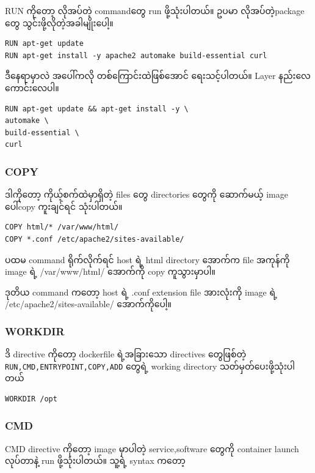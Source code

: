 \documentclass{article}
\begin{document}
RUN ကို​တော့ လိုအပ်​တဲ့ command​တွေ run ဖို့သုံးပါတယ်။ ဥပမာ
လိုအပ်တဲ့​package​တွေ သွင်းဖို့လိုတဲ့အခါမျိုး​ပေါ့။

\begin{verbatim}
RUN apt-get update 
RUN apt-get install -y apache2 automake build-essential curl ​​
\end{verbatim}

ဒီ​နေရာမှာလဲ အ​ပေါ်ကလို တစ်​​ကြောင်းထဲဖြစ်​​အောင်​ ​ရေးသင့်ပါတယ်​။ Layer
နည်း​လေ​ကောင်း​လေပါ။

\begin{verbatim}
RUN apt-get update && apt-get install -y \
automake \
build-essential \
curl
\end{verbatim}

\subsubsection{COPY}\label{copy}

ဒါကို​တော့ ကိုယ့်စက်​ထဲမှာရှိတဲ့ files ​တွေ directories ​တွေကို
​ဆောက်​မယ့် image ​ပေါ်copy ကူးချင်​ရင်​ သုံးပါတယ်။​

\begin{verbatim}
COPY html/* /var/www/html/
COPY *.conf /etc/apache2/sites-available/
\end{verbatim}

ပထမ command ရိုက်​လိုက်​ရင်​ host ရဲ့ html directory ​အောက်​က file
အကုန်​ကို image ရဲ့ /var/www/html/ ​အောက်​ကို copy ကူသွားမှာပါ။

ဒုတိယ command က​တော့ host ရဲ့ .conf extension file အားလုံးကို image ရဲ့
/etc/apache2/sites-available/ ​အောက်​ကို​ပေါ့။

\subsubsection{WORKDIR}\label{workdir}

ဒိ directive ကို​တော့ dockerfile ရဲ့အခြား​သော directives ​တွေဖြစ်​တဲ့
\texttt{RUN,CMD,ENTRYPOINT,COPY,ADD} ​တွေရဲ့ working directory
သတ်​မှတ်​​ပေးဖို့သုံးပါတယ်​

\begin{verbatim}
WORKDIR /opt
\end{verbatim}

\subsubsection{CMD}\label{cmd}

CMD directive ကို​တော့ image မှာပါတဲ့ service,software ​တွေကို container
launch လုပ်​​တာနဲ့ run ဖို့သုံးပါတယ်။​ သူ့ရဲ့ syntax က​တော့
\end{document}
